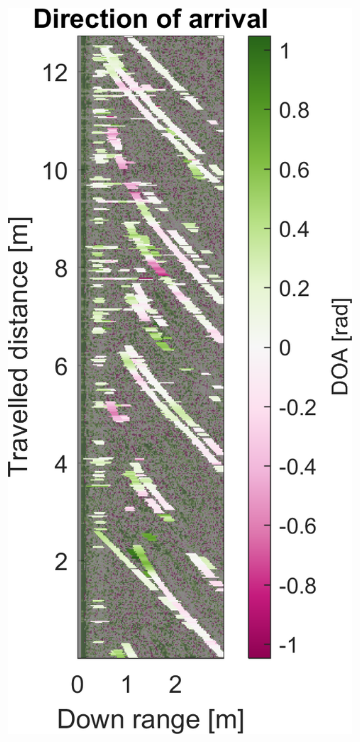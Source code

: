 \begin{figure}[htbp]
\begin{subfigure}[t]{0.475\linewidth}
    \end{subfigure}\bigskip\\
    \begin{subfigure}[t]{0.475\linewidth}  
        \centering 
        \includegraphics[width=\linewidth,max height=.475\textheight]{gfx/results/queue_doa.png}

\end{subfigure}
\end{figure}
